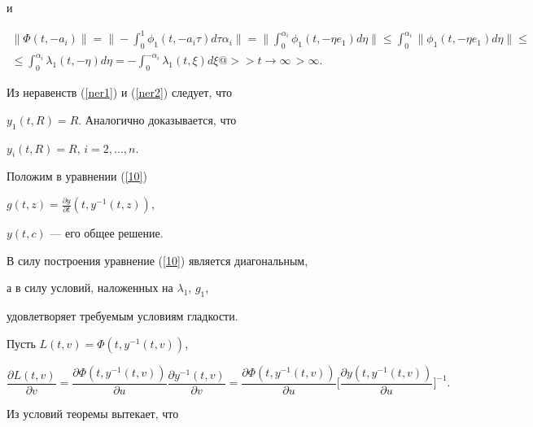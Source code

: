 \begin{pf}
и


\begin{multline}


\label{ner2}


\|\Phi(t,-a_{i})\|=\bigg\|-\int_{0}^{1}\phi_{1}(t,-a_{i}\tau)d\tau\alpha_{i}


\bigg\|=


\bigg\|\int_{0}^{\alpha_{i}}\phi_{1}(t,-\eta e_{1})d\eta\bigg\|\leq


\int_{0}^{\alpha_{i}}\|\phi_{1}(t,-\eta e_{1})d\eta\|\leq \\


%


\leq\int_{0}^{\alpha_{i}}\lambda_{1}(t,-\eta)d\eta=


-\int_{0}^{-\alpha_{i}}\lambda_{1}(t,\xi)d\xi@>>{t\to\infty\,}>\infty.


\end{multline}


Из неравенств (\ref{ner1}) и (\ref{ner2}) следует, что


$y_{1}(t,R)=R$. Аналогично доказывается, что


$y_{i}(t,R)=R$, $i=2,\dotsc,n$.





Положим в уравнении (\ref{10})


$g(t,z)=\frac{\partial y}{\partial t}(t,y^{-1}(t,z))$,


$y(t,c)$ --- его общее решение.


В силу построения уравнение (\ref{10}) является диагональным,


а в силу условий, наложенных на $\lambda_{1}$, $g_{1}$,


удовлетворяет требуемым условиям гладкости.





Пусть $L(t,v)=\Phi(t,y^{-1}(t,v))$,


$$


\frac{\partial L(t,v)}{\partial v}=


\frac{\partial \Phi(t,y^{-1}(t,v))}{\partial u}


\frac{\partial y^{-1}(t,v)}{\partial v}=


\frac{\partial \Phi(t,y^{-1}(t,v))}{\partial u}\bigg [


\frac{\partial y(t,y^{-1}(t,v))}{\partial u} \bigg ]^{-1}.


$$


Из условий теоремы вытекает, что



\end{pf}
